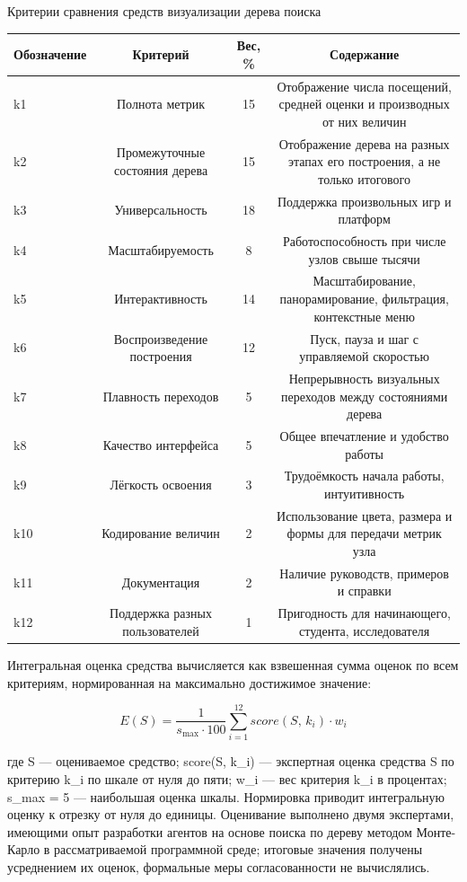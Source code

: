 \begin{gosttable}{}{Критерии сравнения средств визуализации дерева поиска}

\begin{tabularx}{\linewidth}{>{\raggedright\arraybackslash}Xccc}
\hline
Обозначение & Критерий & Вес, \% & Содержание \\
\hline
k1 & Полнота метрик & 15 & Отображение числа посещений, средней оценки и производных от них величин \\
\hline
k2 & Промежуточные состояния дерева & 15 & Отображение дерева на разных этапах его построения, а не только итогового \\
\hline
k3 & Универсальность & 18 & Поддержка произвольных игр и платформ \\
\hline
k4 & Масштабируемость & 8 & Работоспособность при числе узлов свыше тысячи \\
\hline
k5 & Интерактивность & 14 & Масштабирование, панорамирование, фильтрация, контекстные меню \\
\hline
k6 & Воспроизведение построения & 12 & Пуск, пауза и шаг с управляемой скоростью \\
\hline
k7 & Плавность переходов & 5 & Непрерывность визуальных переходов между состояниями дерева \\
\hline
k8 & Качество интерфейса & 5 & Общее впечатление и удобство работы \\
\hline
k9 & Лёгкость освоения & 3 & Трудоёмкость начала работы, интуитивность \\
\hline
k10 & Кодирование величин & 2 & Использование цвета, размера и формы для передачи метрик узла \\
\hline
k11 & Документация & 2 & Наличие руководств, примеров и справки \\
\hline
k12 & Поддержка разных пользователей & 1 & Пригодность для начинающего, студента, исследователя \\
\hline
\end{tabularx}

\end{gosttable}

Интегральная оценка средства вычисляется как взвешенная сумма оценок по всем критериям, нормированная на максимально достижимое значение:

\begin{equation}
E(S) = \dfrac{1}{s_{\max} \cdot 100}\sum_{i=1}^{12} score(S,\, k_i) \cdot w_i
\end{equation}

где S — оцениваемое средство; score(S, k\_i) — экспертная оценка средства S по критерию k\_i по шкале от нуля до пяти; w\_i — вес критерия k\_i в процентах; s\_max = 5 — наибольшая оценка шкалы. Нормировка приводит интегральную оценку к отрезку от нуля до единицы. Оценивание выполнено двумя экспертами, имеющими опыт разработки агентов на основе поиска по дереву методом Монте-Карло в рассматриваемой программной среде; итоговые значения получены усреднением их оценок, формальные меры согласованности не вычислялись.

